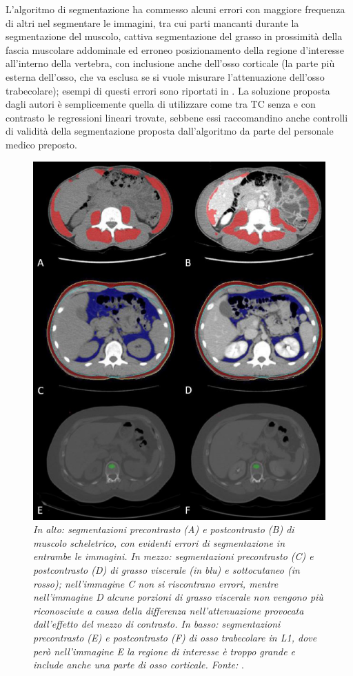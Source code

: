 L’algoritmo di segmentazione ha commesso alcuni errori con maggiore frequenza di altri nel segmentare le immagini, tra cui parti mancanti durante la segmentazione del muscolo, cattiva segmentazione del grasso in prossimità della fascia muscolare addominale ed erroneo posizionamento della regione d’interesse all'interno della vertebra, con inclusione anche dell'osso corticale (la parte più esterna dell'osso, che va esclusa se si vuole misurare l’attenuazione dell'osso trabecolare); esempi di questi errori sono riportati in . La soluzione proposta dagli autori è semplicemente quella di utilizzare come  tra TC senza e con contrasto le regressioni lineari trovate, sebbene essi raccomandino anche controlli di validità della segmentazione proposta dall'algoritmo da parte del personale medico preposto.

\begin{figure}[htp]
\centering
\includegraphics[scale=0.9]{Immagini/perez_errori.png}
\caption{\label{fig:perez_errori} \textit{In alto: segmentazioni precontrasto (A) e postcontrasto (B) di muscolo scheletrico, con evidenti errori di segmentazione in entrambe le immagini. In mezzo: segmentazioni precontrasto (C) e postcontrasto (D) di grasso viscerale (in blu) e sottocutaneo (in rosso); nell'immagine C non si riscontrano errori, mentre nell'immagine D alcune porzioni di grasso viscerale non vengono più riconosciute a causa della differenza nell'attenuazione provocata dall'effetto del mezzo di contrasto. In basso: segmentazioni precontrasto (E) e postcontrasto (F) di osso trabecolare in L1, dove però nell'immagine E la regione di interesse è troppo grande e include anche una parte di osso corticale. Fonte:} \cite{Perez2021}.}
\end{figure}

